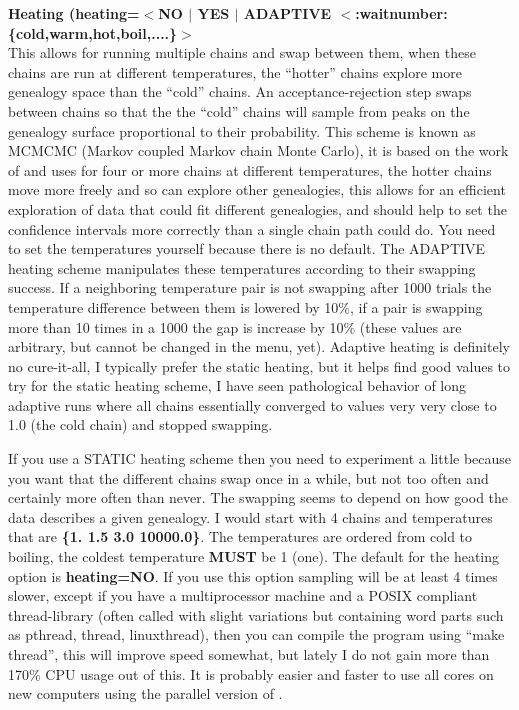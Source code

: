 \begin{description}
\item\textbf{ Heating  (heating=$<$NO $|$ YES $|$ ADAPTIVE $<$:waitnumber:\{cold,warm,hot,boil,....\}$>$}\\
This allows for running multiple chains and swap between them, when 
these chains are run at different temperatures, 
the ``hotter'' chains explore more genealogy space than the 
``cold'' chains. An acceptance-rejection
step swaps between chains so that the the ``cold'' chains will sample
from peaks on the genealogy surface proportional to their
probability. This scheme is known as MCMCMC (Markov 
coupled Markov chain Monte Carlo),
it is based on the work of \cite{geyer:1995:amc} and uses for
four or more chains at different temperatures, the hotter chains move more freely
and so can explore other genealogies, this allows for an efficient 
exploration of data that could fit different genealogies, and should help
to set the confidence intervals more correctly than a single chain path 
could do. You need to set the temperatures yourself because there is no default.
The ADAPTIVE heating scheme manipulates these temperatures according to their
swapping success. If a neighboring temperature pair is not swapping after 1000 trials
the temperature difference between them is lowered by 10\%, if a pair is swapping more than
10 times in a 1000 the gap is increase by 10\% (these values are arbitrary, but cannot be changed in the menu, yet).
Adaptive heating is definitely no cure-it-all, I typically prefer the static heating, but it helps find good values to try for the static heating scheme, I have seen pathological behavior of long adaptive runs where all chains essentially converged to values very very close to 1.0 (the cold chain) and stopped swapping. 

If you use a STATIC heating scheme then you need to experiment a little because you want that the different
chains swap once in a while, but not too often and certainly more often
than never. The swapping seems to depend on how good the data describes a 
given genealogy. I would start with 4 chains and 
temperatures that are \textbf{ \{1. 1.5 3.0 10000.0\}}. 
The temperatures are ordered 
from cold to boiling, the coldest temperature \textbf{ MUST} be 1 (one).
The default for the heating option is \textbf{ heating=NO}. If you use
this option sampling will be at least 4 times slower, except 
if you have a multiprocessor machine and a POSIX compliant thread-library
(often called with slight variations but containing word parts such 
as pthread, thread, linuxthread), 
then you can compile the program using ``make thread'',  this will improve speed somewhat, but lately I do not gain more than 170\% CPU usage out of this. It is probably easier and faster to use all cores on new computers using the parallel version of \migrate.


\end{description}
